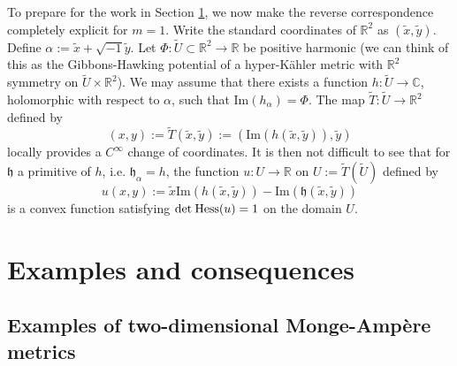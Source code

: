 \documentclass[11pt,reqno]{amsart}
\newcommand{\C}{\mathbb{C}}
\newcommand{\R}{\mathbb{R}}
\theoremstyle{plain}
\theoremstyle{definition}
\numberwithin{equation}{section}
\begin{document}
To prepare for the work in Section \ref{sec:special}, we now make the reverse correspondence completely explicit for $m = 1$. Write the standard coordinates of $\mathbb{R}^2$ as $(\tilde{x},\tilde{y})$. Define $\alpha := \tilde{x} + \sqrt{-1}\tilde{y}$. Let $\Phi :\widetilde{U} \subset \mathbb{R}^2 \to \R$ be positive harmonic (we can think of this as the Gibbons-Hawking potential of a hyper-Kähler metric with $\R^2$ symmetry on $\widetilde{U} \times \R^2$). We may assume that there exists a function $h: \widetilde{U} \to \C$, holomorphic with respect to $\alpha$, such that $\mathrm{Im}(h_\alpha)=\Phi$. The map $\widetilde{T}:\widetilde{U}\to \R^2$ defined by
$$(x,y) := \widetilde{T}(\tilde{x},\tilde{y}):=(\mathrm{Im}(h(\tilde{x},\tilde{y})),\tilde{y})$$
locally provides a $C^\infty$ change of coordinates. It is then not difficult to see that for $\mathfrak{h}$ a primitive of $h$, i.e. $\mathfrak{h}_\alpha = h$, the function $u: U\to \R$ on $U:=\widetilde{T}(\widetilde{U})$ defined by
\begin{equation}\label{u}
u(x,y):=\tilde{x}\mathrm{Im}(h(\tilde{x},\tilde{y}))- \mathrm{Im}(\mathfrak{h}(\tilde{x},\tilde{y}))
\end{equation}
is a convex function satisfying $\det\hspace{0.25mm}{\rm Hess}(u) = 1$ on the domain $U$.

\section{Examples and consequences}\label{sec:special}

\subsection{Examples of two-dimensional Monge-Ampère metrics}
\end{document}
